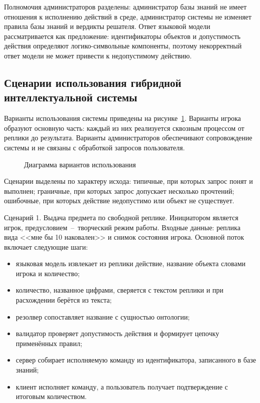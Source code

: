 Полномочия администраторов разделены: администратор базы знаний не имеет отношения к
исполнению действий в среде, администратор системы не изменяет правила базы знаний и
вердикты решателя. Ответ языковой модели рассматривается как предложение: идентификаторы
объектов и допустимость действия определяют логико-символьные компоненты, поэтому
некорректный ответ модели не может привести к недопустимому действию.

\subsection{Сценарии использования гибридной интеллектуальной системы}

Варианты использования системы приведены на рисунке~\ref{fig:use_cases}. Варианты
игрока образуют основную часть: каждый из них реализуется сквозным процессом от реплики
до результата. Варианты администраторов обеспечивают сопровождение системы и не
связаны с обработкой запросов пользователя.

\begin{figure}[!htb]
  \centering
  
  \caption{Диаграмма вариантов использования}
  \label{fig:use_cases}
\end{figure}

Сценарии выделены по характеру исхода: типичные, при которых запрос понят и выполнен;
граничные, при которых запрос допускает несколько прочтений; ошибочные, при которых
действие недопустимо или объект не существует.

Сценарий 1. Выдача предмета по свободной реплике. Инициатором является игрок,
предусловием~--~творческий режим работы. Входные данные: реплика вида <<мне бы 10
наковален>> и снимок состояния игрока. Основной поток включает следующие шаги:

\begin{itemize}
  \item языковая модель извлекает из реплики действие, название объекта словами
        игрока и количество;
  \item количество, названное цифрами, сверяется с текстом реплики и при расхождении
        берётся из текста;
  \item резолвер сопоставляет название с сущностью онтологии;
  \item валидатор проверяет допустимость действия и формирует цепочку применённых
        правил;
  \item сервер собирает исполняемую команду из идентификатора, записанного в базе знаний;
  \item клиент исполняет команду, а пользователь получает подтверждение с итоговым
        количеством.
\end{itemize}

